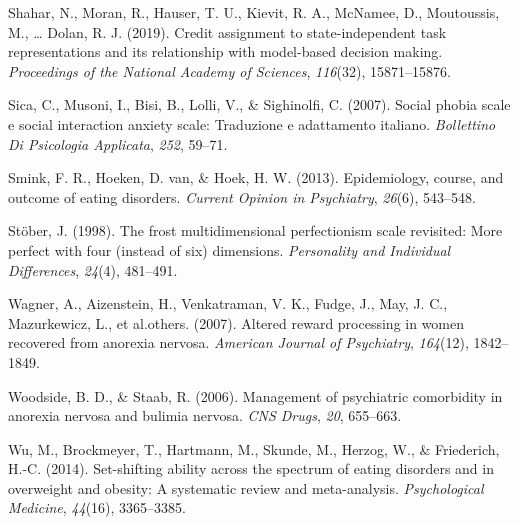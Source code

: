 \documentclass[
  man,floatsintext]{apa6}
\newlength{\cslhangindent}
\newlength{\cslentryspacingunit} %
\newenvironment{CSLReferences}[2] %
 {%
  \setlength{\parindent}{0pt}
  \ifodd #1
  \let\oldpar\par
  \def\par{\hangindent=\cslhangindent\oldpar}
  \fi
  \setlength{\parskip}{#2\cslentryspacingunit}
 }%
 {}
\begin{document}
\begin{CSLReferences}{1}{0}
\leavevmode{}%
Shahar, N., Moran, R., Hauser, T. U., Kievit, R. A., McNamee, D., Moutoussis, M., \ldots{} Dolan, R. J. (2019). Credit assignment to state-independent task representations and its relationship with model-based decision making. \emph{Proceedings of the National Academy of Sciences}, \emph{116}(32), 15871--15876.

\leavevmode{}%
Sica, C., Musoni, I., Bisi, B., Lolli, V., \& Sighinolfi, C. (2007). Social phobia scale e social interaction anxiety scale: Traduzione e adattamento italiano. \emph{Bollettino Di Psicologia Applicata}, \emph{252}, 59--71.

\leavevmode{}%
Smink, F. R., Hoeken, D. van, \& Hoek, H. W. (2013). Epidemiology, course, and outcome of eating disorders. \emph{Current Opinion in Psychiatry}, \emph{26}(6), 543--548.

\leavevmode{}%
Stöber, J. (1998). The frost multidimensional perfectionism scale revisited: More perfect with four (instead of six) dimensions. \emph{Personality and Individual Differences}, \emph{24}(4), 481--491.

\leavevmode{}%
Wagner, A., Aizenstein, H., Venkatraman, V. K., Fudge, J., May, J. C., Mazurkewicz, L., et al.others. (2007). Altered reward processing in women recovered from anorexia nervosa. \emph{American Journal of Psychiatry}, \emph{164}(12), 1842--1849.

\leavevmode{}%
Woodside, B. D., \& Staab, R. (2006). Management of psychiatric comorbidity in anorexia nervosa and bulimia nervosa. \emph{CNS Drugs}, \emph{20}, 655--663.

\leavevmode{}%
Wu, M., Brockmeyer, T., Hartmann, M., Skunde, M., Herzog, W., \& Friederich, H.-C. (2014). Set-shifting ability across the spectrum of eating disorders and in overweight and obesity: A systematic review and meta-analysis. \emph{Psychological Medicine}, \emph{44}(16), 3365--3385.

\end{CSLReferences}
\end{document}
